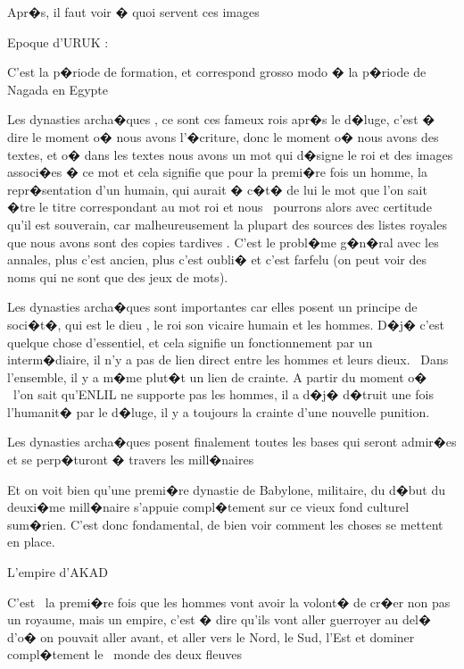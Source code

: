 \documentclass{article}
\begin{document}
Apr�s, il faut voir � quoi servent ces images


\bigskip

Epoque d'URUK : 


\bigskip

C'est la p�riode de formation, et correspond grosso modo � la p�riode de Nagada en Egypte

Les dynasties archa�ques , ce sont ces fameux rois apr�s le d�luge, c'est � dire le moment o� nous avons l'�criture, donc le moment o� nous avons des textes, et o� dans les textes nous avons un mot qui d�signe le roi et des images associ�es � ce mot et cela signifie que pour la premi�re fois un homme, la repr�sentation d'un humain, qui aurait � c�t� de lui le mot que l'on sait �tre le titre correspondant au mot roi et nous \ pourrons alors avec certitude qu'il est souverain, car malheureusement la plupart des sources des listes royales que nous avons sont des copies tardives . C'est le probl�me g�n�ral avec les annales, plus c'est ancien, plus c'est oubli� et c'est farfelu (on peut voir des noms qui ne sont que des jeux de mots).


\bigskip

Les dynasties archa�ques sont importantes car elles posent un principe de soci�t�, qui est le dieu , le roi son vicaire humain et les hommes. D�j� c'est quelque chose d'essentiel, et cela signifie un fonctionnement par un interm�diaire, il n'y a pas de lien direct entre les hommes et leurs dieux. \ Dans l'ensemble, il y a m�me plut�t un lien de crainte. A partir du moment o� \ l'on sait qu'ENLIL ne supporte pas les hommes, il a d�j� d�truit une fois l'humanit� par le d�luge, il y a toujours la crainte d'une nouvelle punition.

Les dynasties archa�ques posent finalement toutes les bases qui seront admir�es et se perp�turont � travers les mill�naires

Et on voit bien qu'une premi�re dynastie de Babylone, militaire, du d�but du deuxi�me mill�naire s'appuie compl�tement sur ce vieux fond culturel sum�rien. C'est donc fondamental, de bien voir comment les choses se mettent en place.


\bigskip


\bigskip

L'empire d'AKAD 

C'est \ la premi�re fois que les hommes vont avoir la volont� de cr�er non pas un royaume, mais un empire, c'est � dire qu'ils vont aller guerroyer au del� d'o� on pouvait aller avant, et aller vers le Nord, le Sud, l'Est et dominer compl�tement le \ monde des deux fleuves
\end{document}
